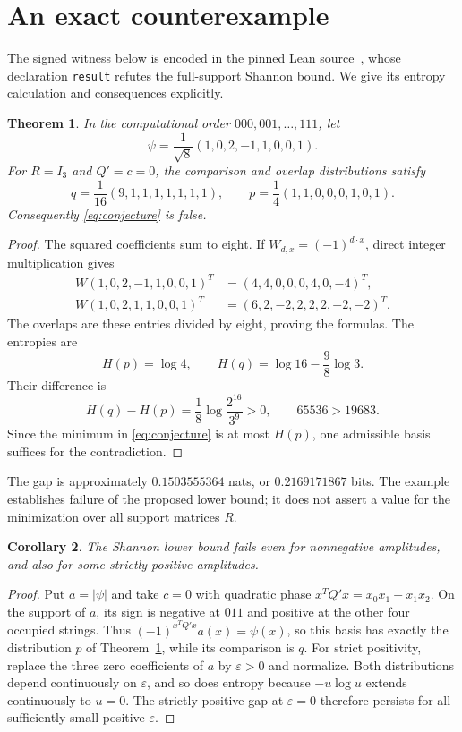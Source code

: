 \documentclass[11pt]{article}
\newtheorem{theorem}{Theorem}
\newtheorem{corollary}[theorem]{Corollary}
\newcommand{\HH}{H}
\begin{document}
\section{An exact counterexample}
The signed witness below is encoded in the pinned Lean source~\cite{lean},
whose declaration \texttt{result} refutes the full-support Shannon bound.
We give its entropy calculation and consequences explicitly.
\begin{theorem}\label{thm:main}
In the computational order $000,001,\ldots,111$, let
\[
 \psi=\frac1{\sqrt8}(1,0,2,-1,1,0,0,1).
\]
For $R=I_3$ and $Q'=c=0$, the comparison and overlap distributions satisfy
\[
 q=\frac1{16}(9,1,1,1,1,1,1,1),\qquad
 p=\frac14(1,1,0,0,0,1,0,1).
\]
Consequently \eqref{eq:conjecture} is false.
\end{theorem}
\begin{proof}
The squared coefficients sum to eight. If $W_{d,x}=(-1)^{d\cdot x}$,
direct integer multiplication gives
\begin{align*}
 W(1,0,2,-1,1,0,0,1)^T&=(4,4,0,0,0,4,0,-4)^T,\\
 W(1,0,2,1,1,0,0,1)^T&=(6,2,-2,2,2,2,-2,-2)^T.
\end{align*}
The overlaps are these entries divided by eight, proving the formulas.
The entropies are
\[
 \HH(p)=\log4,\qquad
 \HH(q)=\log16-\frac98\log3.
\]
Their difference is
\begin{equation}\label{eq:gap}
 \HH(q)-\HH(p)=\frac18\log\frac{2^{16}}{3^9}>0,
 \qquad 65536>19683.
\end{equation}
Since the minimum in \eqref{eq:conjecture} is at most $\HH(p)$,
one admissible basis suffices for the contradiction.
\end{proof}
The gap is approximately $0.1503555364$ nats, or $0.2169171867$ bits.
The example establishes failure of the proposed lower bound;
it does not assert a value for the minimization over all support matrices $R$.

\begin{corollary}\label{cor:positive}
The Shannon lower bound fails even for nonnegative amplitudes,
and also for some strictly positive amplitudes.
\end{corollary}
\begin{proof}
Put $a=|\psi|$ and take $c=0$ with quadratic phase
$x^TQ'x=x_0x_1+x_1x_2$. On the support of $a$, its sign is negative
at $011$ and positive at the other four occupied strings.
Thus $(-1)^{x^TQ'x}a(x)=\psi(x)$, so this basis has exactly the
distribution $p$ of Theorem~\ref{thm:main}, while its comparison is $q$.
For strict positivity, replace the three zero coefficients of $a$ by
$\varepsilon>0$ and normalize. Both distributions depend continuously
on $\varepsilon$, and so does entropy because $-u\log u$ extends
continuously to $u=0$. The strictly positive gap at $\varepsilon=0$
therefore persists for all sufficiently small positive $\varepsilon$.
\end{proof}
\end{document}
